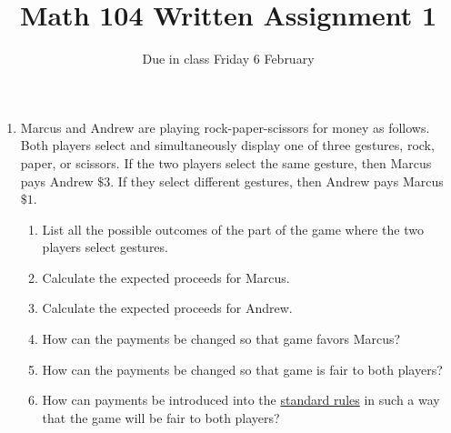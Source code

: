 \documentclass[12pt]{article}
\author{}\date{Due in class Friday 6 February}
\title{Math 104 Written Assignment 1}\author{}
\begin{document}
\maketitle
\pagestyle{empty}
\begin{enumerate}
\item Marcus and Andrew are playing rock-paper-scissors
for money as follows. Both players select and simultaneously display
one of three gestures, rock, paper, or scissors.
If the two players select the same gesture, then Marcus pays Andrew 
$\$3$. If they select different gestures, then Andrew pays Marcus $\$1$.
\begin{enumerate}
\item List all the possible outcomes of the part of the game
where the two players select gestures.
\vspace{.5in}
\item Calculate the expected proceeds for Marcus.
\vspace{.5in}
\item Calculate the expected proceeds for Andrew.
\vspace{.5in}
\item How can the payments be changed so that game favors Marcus?
\vspace{.5in}
\item How can the payments be changed so that game is fair to both
players?
\vspace{.5in}
\item How can payments be introduced into the
\href{http://en.wikipedia.org/wiki/Rock-paper-scissors}{standard rules}
in such a way that the game will be fair to both players?
\end{enumerate}
\end{enumerate}
\end{document}
